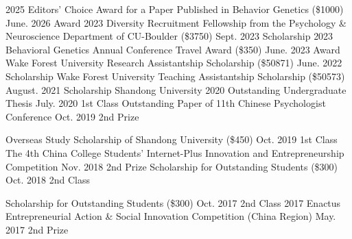 




\begin{cvhonors}
  \cvhonor
    {2025 Editors’ Choice Award for a Paper Published in Behavior Genetics (\$1000)} %
    {June. 2026} %
     {Award }
  \cvhonor
    {2023 Diversity Recruitment Fellowship from the Psychology \& Neuroscience Department of CU-Boulder (\$3750)} %
    {Sept. 2023} %
     {Scholarship}
  \cvhonor
    {2023 Behavioral Genetics Annual Conference Travel Award (\$350)} %
    {June. 2023} %
     {Award }
  \cvhonor
    {Wake Forest University Research Assistantship Scholarship (\$50871)} %
    {June. 2022} %
     {Scholarship }
  \cvhonor
    {Wake Forest University Teaching Assistantship Scholarship (\$50573)} %
    {August. 2021} %
     {Scholarship }
  \cvhonor
    {Shandong University 2020 Outstanding Undergraduate Thesis} %
    {July. 2020} %
     {1st Class }
  \cvhonor
    {Outstanding Paper of 11th Chinese Psychologist Conference} %
    {Oct. 2019} %
    {2nd Prize}

  \cvhonor
    {Overseas Study Scholarship of Shandong University (\approx\$450)} %
    {Oct. 2019} %
     {1st Class}
  \cvhonor
    {The 4th China College Students' Internet-Plus Innovation and Entrepreneurship Competition} %
    {Nov. 2018} %
    {2nd Prize} %
  \cvhonor
    {Scholarship for Outstanding Students (\approx\$300)} %
    {Oct. 2018} %
    {2nd Class}
    
    \cvhonor
    {Scholarship for Outstanding Students (\approx\$300)} %
    {Oct. 2017} %
    {2nd Class} %
  \cvhonor
    {2017 Enactus Entrepreneurial Action \& Social Innovation Competition (China Region)} %
    {May. 2017} %
    {2nd Prize}


\end{cvhonors}


